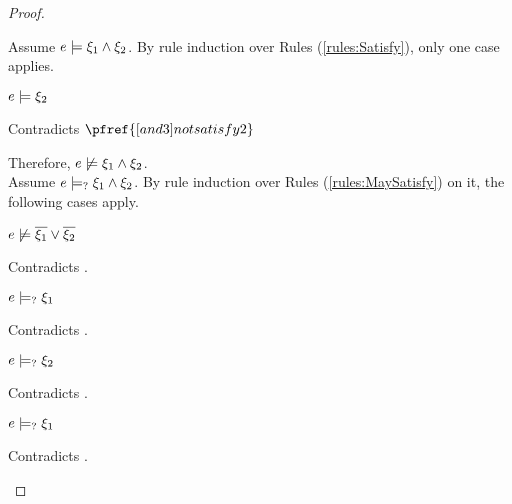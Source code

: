 \begin{proof}
\begin{byCases}
\begin{byCases}
\begin{pfsteps*}
        \end{pfsteps*}
        Assume $e \models \xi_1 \wedge \xi_2$. By rule induction over Rules (\ref{rules:Satisfy}), only one case applies.
        \begin{byCases}
        \item[\text{(\ref{rule:CSAnd})}]
            \begin{pfsteps*}
            \item $e \models \xi_2$ 
            \end{pfsteps*}
            Contradicts $\pfref{[and3]notsatisfy2}$
        \end{byCases}
        Therefore, $e \not\models \xi_1 \wedge \xi_2$.\\
        Assume $e \models_{?} \xi_1 \wedge \xi_2$. By rule induction over Rules (\ref{rules:MaySatisfy}) on it, the following cases apply.
        \begin{byCases}
        \item[\text{(\ref{rule:CMSNotVal})}]
            \begin{pfsteps*}
            \item $e \not\models \overline{\xi_1} \vee \overline{\xi_2}$ 
            \end{pfsteps*}
            Contradicts .
        \item[\text{(\ref{rule:CMSAnd1})}]
            \begin{pfsteps*}
            \item $e \models_{?} \xi_1$ 
            \end{pfsteps*}
            Contradicts .
        \item[\text{(\ref{rule:CMSAnd2})}]
            \begin{pfsteps*}
            \item $e \models_{?} \xi_2$ 
            \end{pfsteps*}
            Contradicts .
        \item[\text{(\ref{rule:CMSAnd3})}]
            \begin{pfsteps*}
            \item $e \models_{?} \xi_1$ 
            \end{pfsteps*}
            Contradicts .

\end{byCases}
\end{byCases}
\end{byCases}
\end{proof}

